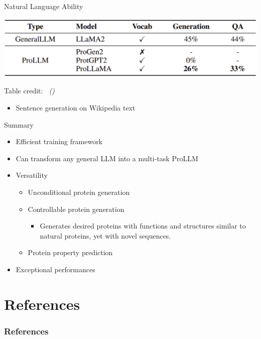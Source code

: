 \documentclass[dvipsnames,
hyperref={citecolor=blue}
]{beamer}
\newcommand{\credit}[2]{{\par\hfill \tiny #1 credit:~\itshape{\color{blue} \citeauthor{#2} (\citeyear{#2})}}}
\begin{document}
\begin{frame}{Natural Language Ability}
	\begin{center}
		\includegraphics[scale=0.21]{tables/natural_language_ability_comparison.png}
	\end{center}
	\credit{Table}{lv2024prollama}
	\begin{itemize}
		\item Sentence generation on Wikipedia text
	\end{itemize}
\end{frame}

\begin{frame}{Summary}
	\begin{itemize}
		\item Efficient training framework
		\item Can transform any general LLM into a multi-task ProLLM
		\item Versatility
		\begin{itemize}
			\item Unconditional protein generation
			\item Controllable protein generation
			\begin{itemize}
				\item Generates desired proteins with functions and structures similar to natural proteins, yet with novel sequences.
			\end{itemize}
			\item Protein property prediction
		\end{itemize}
		\item Exceptional performances
	\end{itemize}
\end{frame}

\section{References}
\begin{frame}[allowframebreaks]
\frametitle{References}
\printbibliography
\end{frame}
\end{document}

